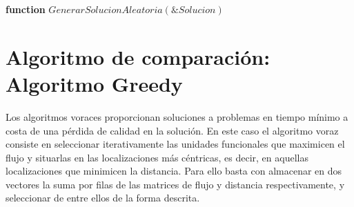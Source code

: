\documentclass[11pt,a4paper]{article}
\begin{document}
		\begin{algorithm}
			
			\textbf{function} $GenerarSolucionAleatoria(\&Solucion)$
			
			
		\end{algorithm}
		
\clearpage

\section{Algoritmo de comparación: Algoritmo Greedy}

	\noindent Los algoritmos voraces proporcionan soluciones a problemas en tiempo mínimo a costa de una pérdida de calidad en la solución. En este caso el algoritmo voraz consiste en seleccionar iterativamente las unidades funcionales que maximicen el flujo y situarlas en las localizaciones más céntricas, es decir, en aquellas localizaciones que minimicen la distancia. Para ello basta con almacenar en dos vectores la suma por filas de las matrices de flujo y distancia respectivamente, y seleccionar de entre ellos de la forma descrita.
	
\end{document}
